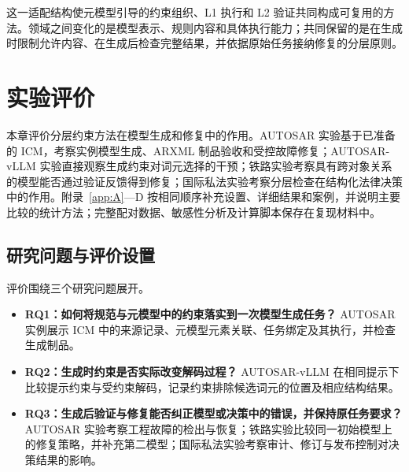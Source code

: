 \documentclass[pdflatex,iicol,sn-mathphys-num]{sn-jnl}
\begin{document}
这一适配结构使元模型引导的约束组织、L1 执行和 L2 验证共同构成可复用的方法。领域之间变化的是模型表示、规则内容和具体执行能力；共同保留的是在生成时限制允许内容、在生成后检查完整结果，并依据原始任务接纳修复的分层原则。


\section{实验评价}\label{sec:evaluation}

本章评价分层约束方法在模型生成和修复中的作用。AUTOSAR 实验基于已准备的 ICM，考察实例模型生成、ARXML 制品验收和受控故障修复；AUTOSAR-vLLM 实验直接观察生成约束对词元选择的干预；铁路实验考察具有跨对象关系的模型能否通过验证反馈得到修复；国际私法实验考察分层检查在结构化法律决策中的作用。附录~\ref{app:A}—D 按相同顺序补充设置、详细结果和案例，并说明主要比较的统计方法；完整配对数据、敏感性分析及计算脚本保存在复现材料中。


\subsection{研究问题与评价设置}\label{sec:eval-4-1}

评价围绕三个研究问题展开。


\begin{itemize}[leftmargin=1.3em,itemsep=3pt,topsep=3pt]

\item \textbf{RQ1：如何将规范与元模型中的约束落实到一次模型生成任务？} AUTOSAR 实例展示 ICM 中的来源记录、元模型元素关联、任务绑定及其执行，并检查生成制品。

\item \textbf{RQ2：生成时约束是否实际改变解码过程？} AUTOSAR-vLLM 在相同提示下比较提示约束与受约束解码，记录约束排除候选词元的位置及相应结构结果。

\item \textbf{RQ3：生成后验证与修复能否纠正模型或决策中的错误，并保持原任务要求？} AUTOSAR 实验考察工程故障的检出与恢复；铁路实验比较同一初始模型上的修复策略，并补充第二模型；国际私法实验考察审计、修订与发布控制对决策结果的影响。

\end{itemize}
\end{document}
